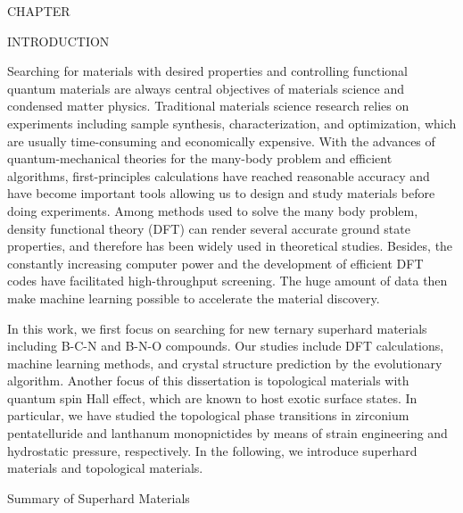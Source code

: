 	{\centering
		\vspace{0pt} \hspace{0pt} \par
	}
	{\centering
		\vspace{56pt} CHAPTER  \the\value{numch}
	}
	{\centering\singlespacing
		INTRODUCTION
	    \par
	}
	{\centering
		\vspace{0pt} \hspace{0pt} \par
	}
    Searching for materials with desired properties and controlling functional quantum materials are always central objectives of materials science and condensed matter physics. Traditional materials science research relies on experiments including sample synthesis, characterization, and optimization, which are usually time-consuming and economically expensive. With the advances of quantum-mechanical theories for the many-body problem and efficient algorithms, first-principles calculations have reached reasonable accuracy and have become important tools allowing us to design and study materials before doing experiments. Among methods used to solve the many body problem, density functional theory (DFT) can render several accurate ground state properties, and therefore has been widely used in theoretical studies. Besides, the constantly increasing computer power and the development of efficient DFT codes have facilitated high-throughput screening. The huge amount of data then make machine learning possible to accelerate the material discovery.
    
    In this work, we first focus on searching for new ternary superhard materials including B-C-N and B-N-O compounds. Our studies include DFT calculations, machine learning methods, and crystal structure prediction by the evolutionary algorithm. Another focus of this dissertation is topological materials with quantum spin Hall effect, which are known to host exotic surface states. In particular, we have studied the topological phase transitions in zirconium pentatelluride and lanthanum monopnictides by means of strain engineering and hydrostatic pressure, respectively. In the following, we introduce superhard materials and topological materials.
    
	{\centering
		\vspace{12pt}Summary of Superhard Materials
	    \par
	}

